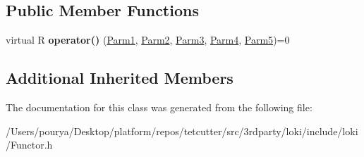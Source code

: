 \subsection*{Public Member Functions}
\begin{DoxyCompactItemize}
\item 
\hypertarget{classLoki_1_1FunctorImpl_3_01R_00_01Seq_3_01P1_00_01P2_00_01P3_00_01P4_00_01P5_01_4_00_01ThreadingModel_01_4_a46b0cfca4ed34b26cdec754707afa5e3}{}virtual R {\bfseries operator()} (\hyperlink{classLoki_1_1EmptyType}{Parm1}, \hyperlink{classLoki_1_1EmptyType}{Parm2}, \hyperlink{classLoki_1_1EmptyType}{Parm3}, \hyperlink{classLoki_1_1EmptyType}{Parm4}, \hyperlink{classLoki_1_1EmptyType}{Parm5})=0\label{classLoki_1_1FunctorImpl_3_01R_00_01Seq_3_01P1_00_01P2_00_01P3_00_01P4_00_01P5_01_4_00_01ThreadingModel_01_4_a46b0cfca4ed34b26cdec754707afa5e3}

\end{DoxyCompactItemize}
\subsection*{Additional Inherited Members}


The documentation for this class was generated from the following file\+:\begin{DoxyCompactItemize}
\item 
/\+Users/pourya/\+Desktop/platform/repos/tetcutter/src/3rdparty/loki/include/loki/Functor.\+h\end{DoxyCompactItemize}
